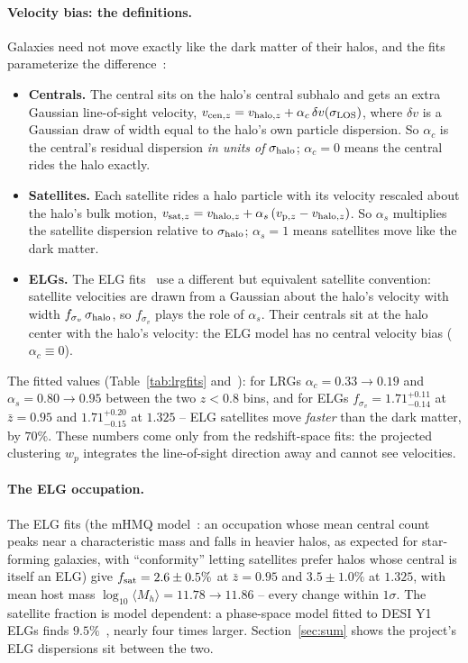 \documentclass[11pt]{article}
\newcommand{\shalo}{\sigma_{\rm halo}}
\begin{document}
\paragraph{Velocity bias: the definitions.}
Galaxies need not move exactly like the dark matter of their halos,
and the fits parameterize the difference~\cite{Yuan2022}:
\begin{itemize}
  \item \textbf{Centrals.}  The central sits on the halo's central
    subhalo and gets an extra Gaussian line-of-sight velocity,
    $v_{{\rm cen},z} = v_{{\rm halo},z} + \alpha_c\,
    \delta v(\sigma_{\rm LOS})$, where $\delta v$ is a Gaussian draw of
    width equal to the halo's own particle dispersion.  So $\alpha_c$
    is the central's residual dispersion \emph{in units of}
    $\shalo$; $\alpha_c = 0$ means the central rides the halo exactly.
  \item \textbf{Satellites.}  Each satellite rides a halo particle
    with its velocity rescaled about the halo's bulk motion,
    $v_{{\rm sat},z} = v_{{\rm halo},z} + \alpha_s\,
    (v_{{\rm p},z} - v_{{\rm halo},z})$.  So $\alpha_s$ multiplies the
    satellite dispersion relative to $\shalo$; $\alpha_s = 1$ means
    satellites move like the dark matter.
  \item \textbf{ELGs.}  The ELG fits~\cite{Rocher2023} use a different
    but equivalent satellite convention: satellite velocities are
    drawn from a Gaussian about the halo's velocity with width
    $f_{\sigma_v}\,\shalo$, so $f_{\sigma_v}$ plays the role of
    $\alpha_s$.  Their centrals sit at the halo center with the halo's
    velocity: the ELG model has no central velocity bias
    ($\alpha_c \equiv 0$).
\end{itemize}
The fitted values (Table~\ref{tab:lrgfits} and~\cite{Rocher2023}):
for LRGs $\alpha_c = 0.33 \to 0.19$ and $\alpha_s = 0.80 \to 0.95$
between the two $z < 0.8$ bins, and for ELGs
$f_{\sigma_v} = 1.71^{+0.11}_{-0.14}$ at $\bar{z} = 0.95$ and
$1.71^{+0.20}_{-0.15}$ at $1.325$ -- ELG satellites move
\emph{faster} than the dark matter, by $70\%$.  These numbers come
only from the redshift-space fits: the projected clustering $w_p$
integrates the line-of-sight direction away and cannot see
velocities.

\paragraph{The ELG occupation.}
The ELG fits (the mHMQ model~\cite{Rocher2023}: an occupation whose
mean central count peaks near a characteristic mass and falls in
heavier halos, as expected for star-forming galaxies, with
``conformity'' letting satellites prefer halos whose central is itself
an ELG) give
$f_{\rm sat} = 2.6 \pm 0.5\%$ at $\bar{z} = 0.95$ and
$3.5 \pm 1.0\%$ at $1.325$, with mean host mass
$\log_{10}\langle M_h\rangle = 11.78 \to 11.86$ -- every change
within $1\sigma$.  The satellite fraction is model dependent: a
phase-space model fitted to DESI Y1 ELGs finds
$9.5\%$~\cite{Favole2025}, nearly four times larger.
Section~\ref{sec:sum} shows the project's ELG dispersions sit between
the two.
\end{document}
